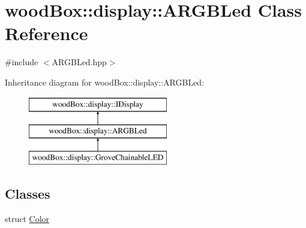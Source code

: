 \hypertarget{classwood_box_1_1display_1_1_a_r_g_b_led}{}\section{wood\+Box\+:\+:display\+:\+:A\+R\+G\+B\+Led Class Reference}
\label{classwood_box_1_1display_1_1_a_r_g_b_led}


{\ttfamily \#include $<$A\+R\+G\+B\+Led.\+hpp$>$}

Inheritance diagram for wood\+Box\+:\+:display\+:\+:A\+R\+G\+B\+Led\+:\begin{figure}[H]
\begin{center}
\leavevmode
\includegraphics[height=3.000000cm]{classwood_box_1_1display_1_1_a_r_g_b_led}
\end{center}
\end{figure}
\subsection*{Classes}
\begin{DoxyCompactItemize}
\item 
struct \mbox{\hyperlink{structwood_box_1_1display_1_1_a_r_g_b_led_1_1_color}{Color}}
\end{DoxyCompactItemize}
